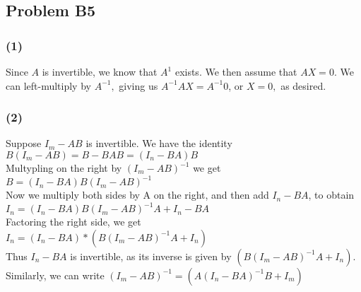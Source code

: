 \documentclass{article}
\begin{document}
\subsection{Problem B5}
\subsubsection{(1)}
Since $A$ is invertible, we know that $A^{1}$ exists.
We then assume that $AX = 0.$ We can left-multiply by $A^{-1},$ giving us
$A^{-1}AX =  A^{-1}0$, or $X = 0,$ as desired.

\subsubsection{(2)}
Suppose $I_m - AB$ is invertible. We have the identity
\\$B(I_m-AB)=B-BAB=(I_n-BA)B$ 
\\Multypling on the right by $(I_m-AB)^{-1}$ we get
\\$B=(I_n-BA)B(I_m-AB)^{-1}$ 
\\Now we multiply both sides by A on the right, and then add $I_n-BA$, to obtain
\\$I_n=(I_n-BA)B(I_m-AB)^{-1}A+I_n-BA$
\\Factoring the right side, we get
\\$I_n=(I_n-BA)*(B(I_m-AB)^{-1}A+I_n)$
\\Thus $I_n-BA$ is invertible, as its inverse is given by $(B(I_m-AB)^{-1}A+I_n)$.
\\Similarly, we can write $(I_m - AB)^{-1} = (A(I_n - BA)^{-1} B+ I_m)$
\end{document}
